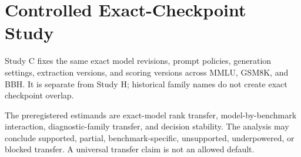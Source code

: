\section{Controlled Exact-Checkpoint Study}

Study C fixes the same exact model revisions, prompt policies, generation settings, extraction
versions, and scoring versions across MMLU, GSM8K, and BBH. It is separate from Study H; historical
family names do not create exact checkpoint overlap.

\begin{center}
\end{center}

The preregistered estimands are exact-model rank transfer, model-by-benchmark interaction,
diagnostic-family transfer, and decision stability. The analysis may conclude supported, partial,
benchmark-specific, unsupported, underpowered, or blocked transfer. A universal transfer claim is
not an allowed default.


